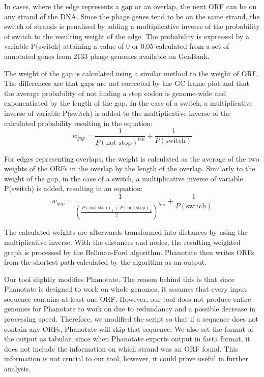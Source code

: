 In cases, where the edge represents a gap or an overlap, the next ORF can be on any strand of the DNA. Since the phage genes tend to be on the same strand, the switch of strands is penalised by adding a multiplicative inverse of the probability of switch to the resulting weight of the edge. The probability is expressed by a variable P(switch) attaining a value of 0 or 0.05 calculated from a set of annotated genes from 2133 phage genomes available on GenBank.

The weight of the gap is calculated using a similar method to the weight of ORF. The differences are that gaps are not corrected by the GC frame plot and that the average probability of not finding a stop codon is genome-wide and exponentiated by the length of the gap. In the case of a switch, a multiplicative inverse of variable P(switch) is added to the multiplicative inverse of the calculated probability resulting in the equation:
\[w_{gap} = \frac{1}{\underline{P}(\text{not stop})^{len}} + \frac{1}{P(\text{switch})}\]

For edges representing overlaps, the weight is calculated as the average of the two weights of the ORFs in the overlap by the length of the overlap. Similarly to the weight of the gap, in the case of a switch, a multiplicative inverse of variable P(switch) is added, resulting in an equation:
\[w_{gap} = \frac{1}{(\frac{P(\text{not stop})_{1} + P(\text{not stop})_{2}}{2})^{len}} + \frac{1}{P(\text{switch})}\]

The calculated weights are afterwards transformed into distances by using the multiplicative inverse. With the distances and nodes, the resulting weighted graph is processed by the Bellman-Ford algorithm. Phanotate then writes ORFs from the shortest path calculated by the algorithm as an output.

Our tool slightly modifies Phanotate. The reason behind this is that since Phanotate is designed to work on whole genomes, it assumes that every input sequence contains at least one ORF. However, our tool does not produce entire genomes for Phanotate to work on due to redundancy and a possible decrease in processing speed. Therefore, we modified the script so that if a sequence does not contain any ORFs, Phanotate will skip that sequence. We also set the format of the output as tabular, since when Phanotate exports output in fasta format, it does not include the information on which strand was an ORF found. This information is not crucial to our tool, however, it could prove useful in further analysis.

